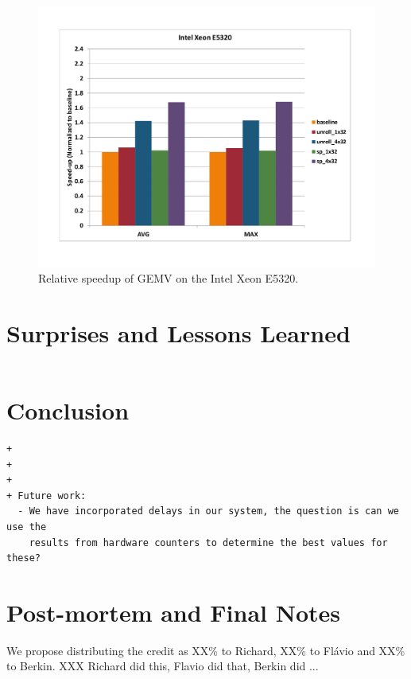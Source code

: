 \documentclass[10pt]{article}
\begin{document}
\begin{figure}[ht]
\begin{center}
\includegraphics[scale=.5]{gemv_xeon_e5320.png}
\end{center}
\caption{Relative speedup of GEMV on the Intel Xeon E5320.}
\label{fig:gemv_corei7}
\end{figure}


\section{Surprises and Lessons Learned}
\begin{verbatim}
\end{verbatim}

\section{Conclusion}
\begin{verbatim}
+
+
+
+ Future work:
  - We have incorporated delays in our system, the question is can we use the
    results from hardware counters to determine the best values for these?
\end{verbatim}

\section{Post-mortem and Final Notes}

We propose distributing the credit as XX\% to Richard, XX\% to Flávio and XX\% to Berkin.
XXX Richard did this, Flavio did that, Berkin did ...



\end{document}
